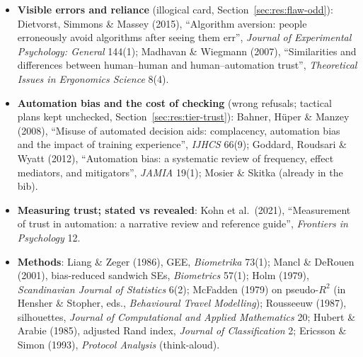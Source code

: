\documentclass[10pt]{article}
\theoremstyle{definition}
\begin{document}
\begin{itemize}[itemsep=2pt]
    systems'', \emph{Theoretical Issues in Ergonomics Science} 8(4).
  \item \textbf{Visible errors and reliance} (illogical card, Section~\ref{sec:res:flaw-odd}): Dietvorst, Simmons
    \& Massey (2015), ``Algorithm aversion: people erroneously avoid algorithms after seeing them err'',
    \emph{Journal of Experimental Psychology: General} 144(1); Madhavan \& Wiegmann (2007), ``Similarities and
    differences between human--human and human--automation trust'', \emph{Theoretical Issues in Ergonomics
    Science} 8(4).
  \item \textbf{Automation bias and the cost of checking} (wrong refusals; tactical plans kept unchecked,
    Section~\ref{sec:res:tier-trust}): Bahner, H\"uper \& Manzey (2008), ``Misuse of automated decision aids:
    complacency, automation bias and the impact of training experience'', \emph{IJHCS} 66(9); Goddard, Roudsari \&
    Wyatt (2012), ``Automation bias: a systematic review of frequency, effect mediators, and mitigators'',
    \emph{JAMIA} 19(1); Mosier \& Skitka (already in the bib).
  \item \textbf{Measuring trust; stated vs revealed}: Kohn et al.\ (2021), ``Measurement of trust in automation: a
    narrative review and reference guide'', \emph{Frontiers in Psychology} 12.
  \item \textbf{Methods}: Liang \& Zeger (1986), GEE, \emph{Biometrika} 73(1); Mancl \& DeRouen (2001), bias-reduced
    sandwich SEs, \emph{Biometrics} 57(1); Holm (1979), \emph{Scandinavian Journal of Statistics} 6(2); McFadden
    (1979) on pseudo-$R^2$ (in Hensher \& Stopher, eds., \emph{Behavioural Travel Modelling}); Rousseeuw (1987),
    silhouettes, \emph{Journal of Computational and Applied Mathematics} 20; Hubert \& Arabie (1985), adjusted Rand
    index, \emph{Journal of Classification} 2; Ericsson \& Simon (1993), \emph{Protocol Analysis} (think-aloud).
\end{itemize}
\end{document}
